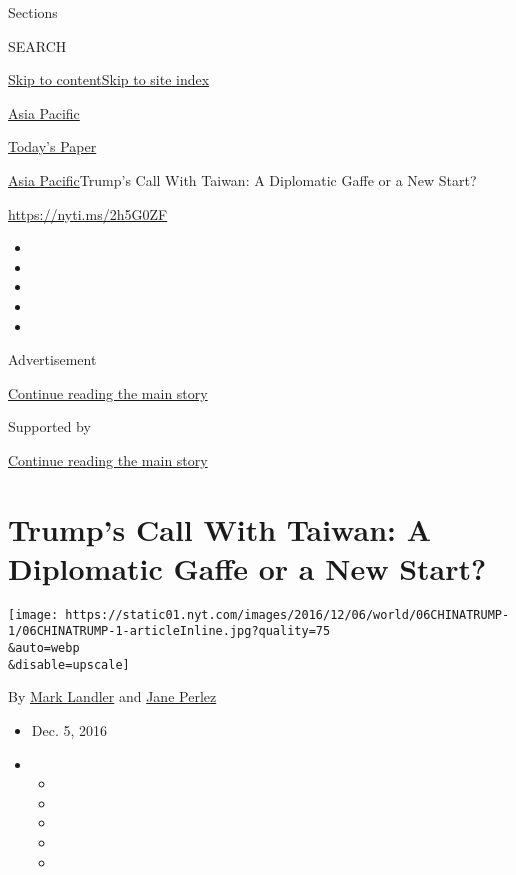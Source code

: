 Sections

SEARCH

\protect\hyperlink{site-content}{Skip to
content}\protect\hyperlink{site-index}{Skip to site index}

\href{https://www.nytimes.com/section/world/asia}{Asia Pacific}

\href{https://myaccount.nytimes.com/auth/login?response_type=cookie\&client_id=vi}{}

\href{https://www.nytimes.com/section/todayspaper}{Today's Paper}

\href{/section/world/asia}{Asia Pacific}\textbar{}Trump's Call With
Taiwan: A Diplomatic Gaffe or a New Start?

\url{https://nyti.ms/2h5G0ZF}

\begin{itemize}
\item
\item
\item
\item
\item
\end{itemize}

Advertisement

\protect\hyperlink{after-top}{Continue reading the main story}

Supported by

\protect\hyperlink{after-sponsor}{Continue reading the main story}

\hypertarget{trumps-call-with-taiwan-a-diplomatic-gaffe-or-a-new-start}{%
\section{Trump's Call With Taiwan: A Diplomatic Gaffe or a New
Start?}\label{trumps-call-with-taiwan-a-diplomatic-gaffe-or-a-new-start}}

\texttt{[image: https://static01.nyt.com/images/2016/12/06/world/06CHINATRUMP-1/06CHINATRUMP-1-articleInline.jpg?quality=75\\\&auto=webp\\\&disable=upscale]}

By \href{http://www.nytimes.com/by/mark-landler}{Mark Landler} and
\href{http://www.nytimes.com/by/jane-perlez}{Jane Perlez}

\begin{itemize}
\item
  Dec. 5, 2016
\item
  \begin{itemize}
  \item
  \item
  \item
  \item
  \item
  \end{itemize}
\end{itemize}


